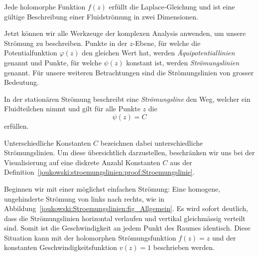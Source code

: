 		\begin{satz}
			Jede holomorphe Funktion $f(z)$ erfüllt die Laplace-Gleichung
			und ist eine gültige Beschreibung einer Fluidströmung in zwei Dimensionen.
			\label{joukowski:stroemungslinien:satz:holomorphe-funktion}
		\end{satz}
		
		Jetzt können wir alle Werkzeuge der komplexen Analysis anwenden, um unsere Strömung zu beschreiben.		
		Punkte in der $z$-Ebene, für welche die Potentialfunktion $\varphi(z)$ den gleichen Wert hat, werden \emph{Äquipotentiallinien} genannt
		und Punkte, für welche $\psi(z)$ konstant ist, werden \emph{Strömungslinien} genannt.
%
		Für unsere weiteren Betrachtungen sind die Strömungslinien von grosser Bedeutung.
		
		\begin{definition}[Strömungslinie]
			\label{joukowski:stroemungslinien:proof:Stroemungslinie}
			In der stationären Strömung beschreibt eine \emph{Strömungsline} den Weg, welcher ein Fluidteilchen nimmt
%
			und gilt für alle Punkte $z$ die
			\[
				\psi(z) = C
			\]
			erfüllen.
		\end{definition}
		Unterschiedliche Konstanten $C$ bezeichnen dabei unterschiedliche Strömungslinien.
		Um diese übersichtlich darzustellen, beschränken wir uns bei der Visualisierung auf eine diskrete Anzahl Konstanten $C$ aus der Definition~\ref{joukowski:stroemungslinien:proof:Stroemungslinie}.
		
		
		\begin{beispiel}
			\label{joukowski:stroemungslinien:beispiel:ungestoerte-Stroemung}
			Beginnen wir mit einer möglichst einfachen Strömung: Eine homogene, ungehinderte Strömung von links nach rechts, wie in Abbildung~\ref{joukowski:Stroemungslinien:fig_Allgemein}.
			Es wird sofort deutlich, dass die Strömungslinien horizontal verlaufen und vertikal gleichmässig verteilt sind.
			Somit ist die Geschwindigkeit an jedem Punkt des Raumes identisch.
Diese Situation
			kann mit der holomorphen Strömungsfunktion $f(z) = z$ und der konstanten Geschwindigkeitsfunktion ${v(z)} = 1$ beschrieben werden.
		\end{beispiel}
		
